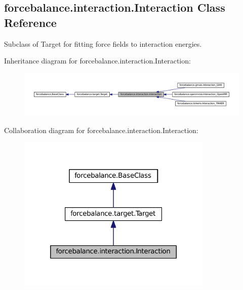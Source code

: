\hypertarget{classforcebalance_1_1interaction_1_1Interaction}{\subsection{forcebalance.\-interaction.\-Interaction \-Class \-Reference}
\label{classforcebalance_1_1interaction_1_1Interaction}
}


\-Subclass of \-Target for fitting force fields to interaction energies.  




\-Inheritance diagram for forcebalance.\-interaction.\-Interaction\-:\nopagebreak
\begin{figure}[H]
\begin{center}
\leavevmode
\includegraphics[width=350pt]{classforcebalance_1_1interaction_1_1Interaction__inherit__graph}
\end{center}
\end{figure}


\-Collaboration diagram for forcebalance.\-interaction.\-Interaction\-:\nopagebreak
\begin{figure}[H]
\begin{center}
\leavevmode
\includegraphics[width=264pt]{classforcebalance_1_1interaction_1_1Interaction__coll__graph}
\end{center}
\end{figure}
